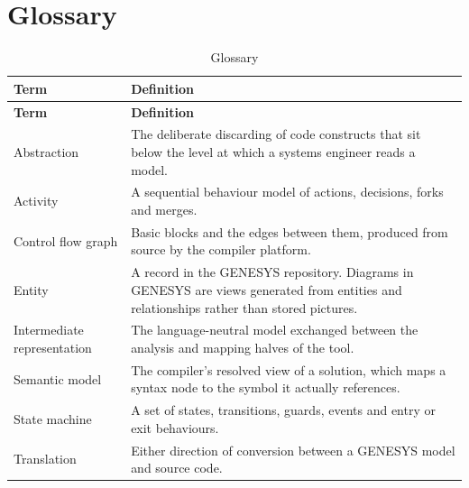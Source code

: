 \chapter{Glossary}
\label{ch:glossary}

\begin{longtable}{L{0.26\textwidth}L{0.66\textwidth}}
	\caption{Glossary}\label{tab:glossary}\\
	\toprule
	\textbf{Term} & \textbf{Definition} \\
	\midrule
	\endfirsthead
	\toprule
	\textbf{Term} & \textbf{Definition} \\
	\midrule
	\endhead

	Abstraction & The deliberate discarding of code constructs that sit below the
	level at which a systems engineer reads a model. \\
	\addlinespace
	Activity & A sequential behaviour model of actions, decisions, forks and
	merges. \\
	\addlinespace
	Control flow graph & Basic blocks and the edges between them, produced from
	source by the compiler platform. \\
	\addlinespace
	Entity & A record in the GENESYS repository. Diagrams in GENESYS are views
	generated from entities and relationships rather than stored pictures. \\
	\addlinespace
	Intermediate representation & The language-neutral model exchanged between the
	analysis and mapping halves of the tool. \\
	\addlinespace
	Semantic model & The compiler's resolved view of a solution, which maps a
	syntax node to the symbol it actually references. \\
	\addlinespace
	State machine & A set of states, transitions, guards, events and entry or exit
	behaviours. \\
	\addlinespace
	Translation & Either direction of conversion between a GENESYS model and
	source code. \\
	\bottomrule
\end{longtable}
